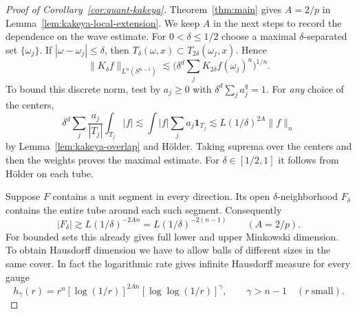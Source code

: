 \begin{proof}[Proof of Corollary~\ref{cor:quant-kakeya}]
Theorem~\ref{thm:main} gives \(A=2/p\) in
Lemma~\ref{lem:kakeya-local-extension}. We keep \(A\) in the next
steps to record the dependence on the wave estimate.
For \(0<\delta\le1/2\) choose a maximal \(\delta\)-separated set
\(\{\omega_j\}\). If \(|\omega-\omega_j|\le\delta\), then
\(T_\delta(\omega,x)\subset T_{2\delta}(\omega_j,x)\). Hence
\[
 \|K_\delta f\|_{L^n(S^{n-1})}
       \lesssim \Big(\delta^d\sum_j K_{2\delta}f(\omega_j)^n\Big)^{1/n}.
\]
To bound this discrete norm, test by \(a_j\ge0\) with
\(\delta^d\sum_j a_j^q=1\). For \emph{any} choice of the centers,
\[
 \delta^d\sum_j\frac{a_j}{|T_j|}\int_{T_j}|f|
 \lesssim \int |f|\sum_j a_j\mathbf1_{T_j}
 \lesssim L(1/\delta)^{2A}\|f\|_n
\]
by Lemma~\ref{lem:kakeya-overlap} and H\"older. Taking suprema over
the centers and then the weights proves the maximal estimate.
For \(\delta\in[1/2,1]\) it follows from H\"older on each tube.

Suppose \(F\) contains a unit segment in every direction. Its open
\(\delta\)-neighborhood \(F_\delta\) contains the entire tube around
each such segment. Consequently
\begin{equation}\label{eq:kakeya-volume}
 |F_\delta|\gtrsim L(1/\delta)^{-2An}
                 =L(1/\delta)^{-2(n-1)}\qquad (A=2/p).
\end{equation}
For bounded sets this already gives full lower and upper Minkowski
dimension. To obtain Hausdorff dimension we have to allow balls of
different sizes in the same cover. In fact the logarithmic rate gives
infinite Hausdorff measure for every gauge
\[
 h_\gamma(r)=r^n[\log(1/r)]^{2An}
                  [\log\log(1/r)]^\gamma,\qquad \gamma>n-1
 \quad (r\ \text{small}).
\]


\end{proof}
